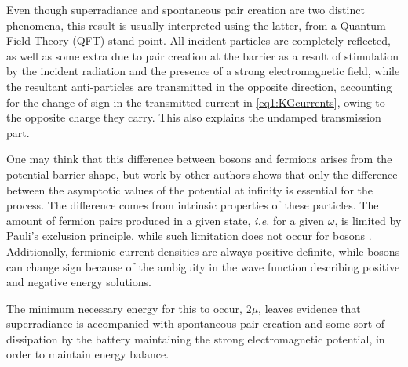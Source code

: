 Even though superradiance and spontaneous pair creation are two distinct phenomena, this result is usually interpreted using the latter, from a Quantum Field Theory (QFT) stand point. 
All incident particles are completely reflected, as well as some extra due to pair creation at the barrier as a result of stimulation by the incident radiation and the presence of a strong electromagnetic field, while the resultant anti-particles are transmitted in the opposite direction, accounting for the change of sign in the transmitted current in \eqref{eq1:KGcurrents}, owing to the opposite charge they carry. 
This also explains the undamped transmission part.

One may think that this difference between bosons and fermions arises from the potential barrier shape, but work by other authors \cite{Sauter1931,Manogue1988,Winter1959} shows that only the difference between the asymptotic values of the potential at infinity is essential for the process. 
The difference comes from intrinsic properties of these particles. 
The amount of fermion pairs produced in a given state, \emph{i.e.} for a given $\omega$, is limited by Pauli's exclusion principle, while such limitation does not occur for bosons \cite{Brito2015}. 
Additionally, fermionic current densities are always positive definite, while bosons can change sign because of the ambiguity in the wave function describing positive and negative energy solutions. 

The minimum necessary energy for this to occur, $2\mu$, leaves evidence that superradiance is accompanied with spontaneous pair creation and some sort of dissipation by the battery maintaining the strong electromagnetic potential, in order to maintain energy balance.   




\cleardoublepage
